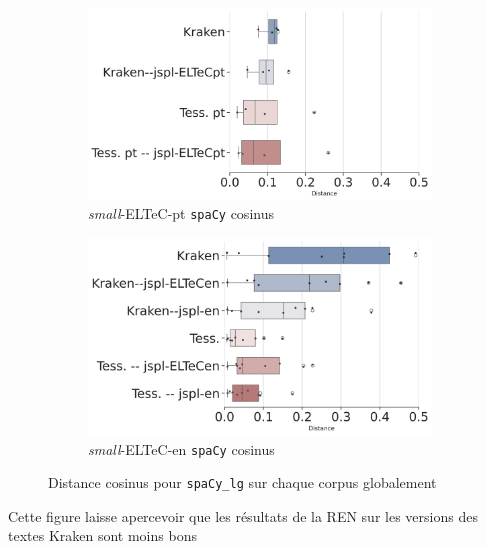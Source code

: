 \begin{figure}[h!]
    \begin{subfigure}{0.45\textwidth}
  \includegraphics[height=.57\textwidth]{IMAGES/Boite-a_moustache_12072024/ELTeC_Por_spaCy3.5.1/ELTeC_Por_spaCy3.5.1-lg-cosinus-sim2-3.png} 
        \caption{\textit{small}-ELTeC-pt \texttt{spaCy} cosinus} 
         \label{fig:ELTeC-Por-spaCy-cosinus}
   \end{subfigure}
    \begin{subfigure}{0.45\textwidth}
  \includegraphics[height=.58\textwidth]{IMAGES/Boite-a_moustache_12072024/ELTeC_eng_spaCy3.5.1/ELTeC_eng_spaCy3.5.1-lg-cosinus-sim2-3.png}
        \caption{\textit{small}-ELTeC-en \texttt{spaCy} cosinus}
        \label{fig:Cosinus-spaCy-lg-ELTeC-eng}
   \end{subfigure}

    \caption{Distance cosinus pour \texttt{spaCy\_lg} sur chaque corpus globalement}
\label{fig:Cosinus-spacy-lg}
\end{figure}
Cette figure laisse apercevoir que les résultats de la REN sur les versions des textes Kraken sont moins bons 
